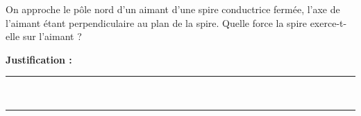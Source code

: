On approche le pôle nord d'un aimant d'une spire conductrice fermée, l'axe de l'aimant étant perpendiculaire au plan de la spire. Quelle force la spire exerce-t-elle sur l'aimant ?

\choices

\noindent\textbf{Justification :} \hrulefill \\[2.5ex]
\rule{\linewidth}{0.4pt} \\[2.5ex]
\rule{\linewidth}{0.4pt}
\vfill
